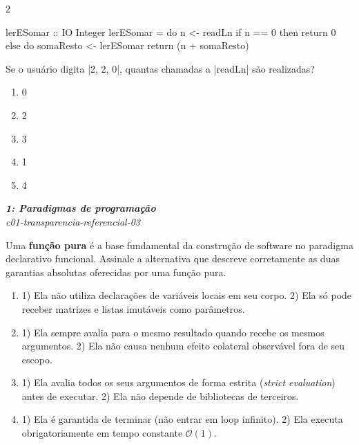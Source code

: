 \documentclass[a4paper,10pt,brazil]{article}
\begin{document}
\begin{multicols}{2}
\begin{haskellcode}
lerESomar :: IO Integer
lerESomar = do
  n <- readLn
  if n == 0
    then return 0
    else do
      somaResto <- lerESomar
      return (n + somaResto)
\end{haskellcode}

Se o usuário digita \haskellinline|2, 2, 0|, quantas chamadas a \haskellinline|readLn| são realizadas?

\begin{enumerate}
  \item 0

  \item 2

  \item 3

  \item 1

  \item 4


\end{enumerate}

\begin{flushright}
  \footnotesize
  \textit{\textbf{1: Paradigmas de programação}}\\
  \textit{c01-transparencia-referencial-03}\\

\end{flushright}
Uma \textbf{função pura} é a base fundamental da construção de software no paradigma declarativo funcional. Assinale a alternativa que descreve corretamente as duas garantias absolutas oferecidas por uma função pura.

\begin{enumerate}
  \item 1) Ela não utiliza declarações de variáveis locais em seu corpo. 2) Ela só pode receber matrizes e listas imutáveis como parâmetros.

  \item 1) Ela sempre avalia para o mesmo resultado quando recebe os mesmos argumentos. 2) Ela não causa nenhum efeito colateral observável fora de seu escopo.

  \item 1) Ela avalia todos os seus argumentos de forma estrita (\emph{strict evaluation}) antes de executar. 2) Ela não depende de bibliotecas de terceiros.

  \item 1) Ela é garantida de terminar (não entrar em loop infinito). 2) Ela executa obrigatoriamente em tempo constante $\mathcal{O}(1)$.


\end{enumerate}
\end{multicols}
\end{document}

